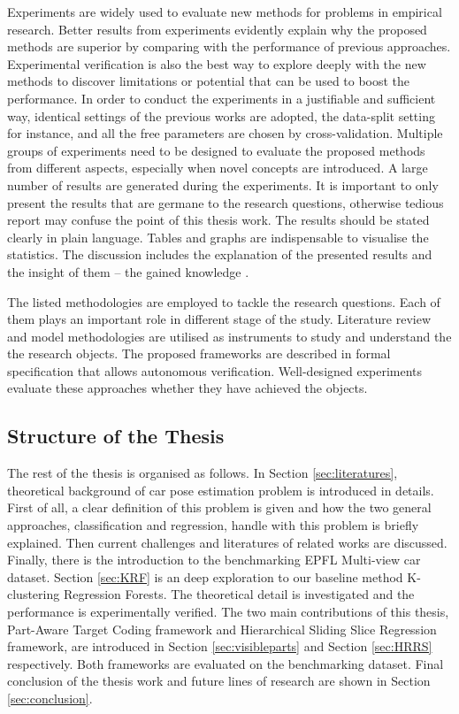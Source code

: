 \documentclass{tutmscthesis}[2010/09/22]
\numberwithin{equation}{section}
\numberwithin{table}{section}
\numberwithin{figure}{section}
\begin{document}
\vspace{0.1cm}  Experiments are widely used to evaluate new methods for problems in empirical research.
Better results from experiments evidently explain why the proposed methods are superior by comparing with the performance of previous approaches.
Experimental verification is also the best way to explore deeply with the new methods to discover limitations or potential  that can be used to boost the performance.
In order to conduct the experiments in a justifiable and sufficient way, identical settings of the previous works are adopted, the data-split setting for instance, and all the free parameters are chosen by cross-validation.
Multiple groups of experiments need to be designed to evaluate the proposed methods from different aspects, especially when novel concepts are introduced.  
A large number of results are generated during the experiments.
It is important to only present the results that are germane to the research questions, otherwise tedious report may confuse the point of this thesis work.
The results should be stated clearly in plain language.
Tables and graphs are indispensable to visualise the statistics.
The discussion includes the explanation of the presented results and the insight of them -- the gained knowledge \cite{elio2011computing}.

The listed methodologies are employed to tackle the research questions.
Each of them plays an important role in different stage of the study.
Literature review and model methodologies are utilised as instruments to study and understand the the research objects.
The proposed frameworks are described in formal specification that allows autonomous verification.
Well-designed experiments evaluate these approaches whether they have achieved the objects.

 
\subsection{Structure of the Thesis}

The rest of the thesis is organised as follows. In Section \ref{sec:literatures}, theoretical background of car pose estimation problem is introduced in details. 
First of all, a clear definition of this problem is given and how the two general approaches, classification and regression, handle with this problem is briefly explained. 
Then current challenges and literatures of related works are discussed. 
Finally, there is the introduction to the benchmarking EPFL Multi-view car dataset. 
Section \ref{sec:KRF} is an deep exploration to our baseline method K-clustering Regression Forests. 
The theoretical detail is investigated and the performance is experimentally verified.  
The two main contributions of this thesis, Part-Aware Target Coding framework and Hierarchical Sliding Slice Regression framework, are introduced in Section \ref{sec:visibleparts} and Section \ref{sec:HRRS} respectively.
Both frameworks are evaluated on the benchmarking dataset.
Final conclusion of the thesis work and future lines of research are shown in Section \ref{sec:conclusion}. 
\end{document}
